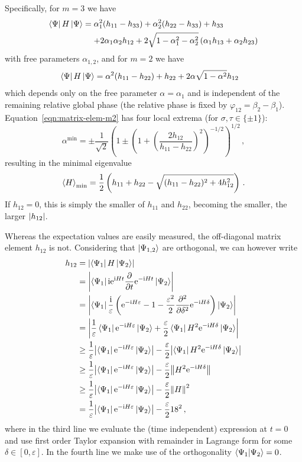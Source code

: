 \documentclass[a4paper,12pt]{article}
\newcommand{\bleq}{\ensuremath{\mathrel{\phantom{=}}}}
\newcommand{\nnl}{\nonumber\\}
\newcommand{\rme}{\mathrm{e}}
\newcommand{\rmi}{\mathrm{i}}
\begin{document}
Specifically, for $m=3$ we have
\begin{align}
 \bra{\Psi} H \ket{\Psi} 
 &= \alpha_1^2 (h_{11}-h_{33})
 + \alpha_2^2 (h_{22}-h_{33})
 + h_{33} \nnl
&\bleq + 2 \alpha_1 \alpha_2 h_{12}
+ 2 \sqrt{1-\alpha_1^2-\alpha_2^2} \left( \alpha_1 h_{13}
+ \alpha_2 h_{23} \right)
\end{align}
with free parameters $\alpha_{1,2}$, and for $m=2$ we have
\begin{align}\label{eqn:matrix-elem-m2}
 \left\langle{\Psi}\right\vert H \left\vert{\Psi}\right\rangle 
 &= \alpha^2 (h_{11}-h_{22}) + h_{22}
 + 2 \alpha \sqrt{1-\alpha^2} h_{12}
\end{align}
which depends only on the free parameter $\alpha = \alpha_1$ and is independent of the remaining relative global phase (the relative phase is fixed by $\varphi_{12} = \beta_2-\beta_1$).
Equation~\eqref{eqn:matrix-elem-m2} has four local extrema (for $\sigma, \tau \in \{\pm 1\}$):
\begin{equation}
\alpha^\text{min} = \pm \frac{1}{\sqrt{2}}\left(1 \pm \left(1 + \left(\frac{2h_{12}}{h_{11} - h_{22}} \right)^2\right)^{-1/2}\right)^{1/2} \,,
\end{equation}
resulting in the minimal eigenvalue
\begin{equation}\label{eqn:hmin-subspace}
 \ev{H}_\text{min} 
 = \frac{1}{2} \left(h_{11} + h_{22} 
 - \sqrt{(h_{11} - h_{22})^2 + 4 h_{12}^2}\right) \,.
\end{equation}
If $h_{12} = 0$, this is simply the smaller of $h_{11}$ and $h_{22}$, becoming the smaller, the larger $\abs{h_{12}}$.


Whereas the expectation values are easily measured, the off-diagonal matrix element $h_{12}$ is not. Considering that $\left\vert{\Psi_{1,2}}\right\rangle$ are orthogonal, we can however write
\begin{align} \label{eqn:h12-estimate}
h_{12}
 &= \abs{\bra{\Psi_1} H \ket{\Psi_2}} \nnl 
 &=
 \abs{\bra{\Psi_1} \rmi \rme^{\rmi H t} \frac{\partial}{\partial t}\rme^{-\rmi H t}  \ket{\Psi_2}} \nnl
 &= \abs{\bra{\Psi_1} \frac{\rmi}{\varepsilon} \left(\rme^{-\rmi H \varepsilon} - 1 - \frac{\varepsilon^2}{2} \frac{\partial^2}{\partial \delta^2}\rme^{-\rmi H \delta} \right)  \ket{\Psi_2}} \nnl
 &= \abs{\frac{1}{\varepsilon} \bra{\Psi_1} \rme^{-\rmi H \varepsilon} \ket{\Psi_2} + \frac{\varepsilon}{2} \bra{\Psi_1} H^2\rme^{-\rmi H \delta} \ket{\Psi_2}} \nnl
 &\geq \frac{1}{\varepsilon} \abs{\bra{\Psi_1} \rme^{-\rmi H \varepsilon} \ket{\Psi_2}} - \frac{\varepsilon}{2}\abs{\bra{\Psi_1} H^2\rme^{-\rmi H \delta} \ket{\Psi_2}} \nnl
 &\geq \frac{1}{\varepsilon} \abs{\bra{\Psi_1} \rme^{-\rmi H \varepsilon} \ket{\Psi_2}} - \frac{\varepsilon}{2}\norm{ H^2\rme^{-\rmi H \delta} } \nnl
&\geq \frac{1}{\varepsilon} \abs{\bra{\Psi_1} \rme^{-\rmi H \varepsilon} \ket{\Psi_2}} - \frac{\varepsilon}{2}\norm{H}^2 \nnl
&= \frac{1}{\varepsilon} \abs{\bra{\Psi_1} \rme^{-\rmi H \varepsilon} \ket{\Psi_2}} - \frac{\varepsilon}{2} 18^2 \,,
\end{align}
where in the third line we evaluate the (time independent) expression at $t=0$ and use first order Taylor expansion with remainder in Lagrange form for some $\delta \in [0,\varepsilon]$. In the fourth line we make use of the orthogonality $\braket{\Psi_1}{\Psi_2} = 0$.
\end{document}
